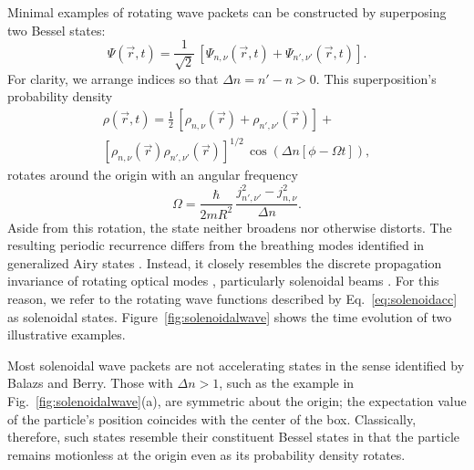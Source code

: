 Minimal examples of rotating wave packets
can be constructed by superposing two Bessel states:
\begin{equation}
  \label{eq:solenoidacc}
  \Psi(\vec{r}, t)
  =
  \frac{1}{\sqrt{2}} \, \left[
    \Psi_{n,\nu}(\vec{r}, t) +
    \Psi_{n', \nu'}(\vec{r}, t)
  \right].
\end{equation}
For clarity, we arrange indices so that $\Delta n = n' - n > 0$.
This superposition's probability density
\begin{multline}
  \rho(\vec{r}, t)
  =
  \frac{1}{2} \, 
  \left[ \rho_{n,\nu}(\vec{r}) + \rho_{n',\nu'}(\vec{r}) \right] + \\
  \left[ \rho_{n,\nu}(\vec{r}) \rho_{n',\nu'}(\vec{r}) \right]^{1/2} \,
    \cos\left( \Delta n[ \phi - \Omega t] \right),
\end{multline}
rotates around the origin with an angular frequency
\begin{equation}
  \label{eq:frequency}
  \Omega = \frac{\hbar}{2m R^2} \,
  \frac{j_{n',\nu'}^2 - j_{n,\nu}^2}{\Delta n}.
\end{equation}
Aside from this rotation, the state neither broadens nor
otherwise distorts.
The resulting periodic recurrence differs from the
breathing modes identified in generalized Airy states
\cite{kaminer12}.
Instead, it closely resembles the discrete
propagation invariance of rotating optical modes \cite{tervo2001},
particularly solenoidal beams \cite{lee10}.
For this reason, we refer to the rotating
wave functions described by Eq.~\eqref{eq:solenoidacc} as
solenoidal states.
Figure~\ref{fig:solenoidalwave} shows the time evolution of
two illustrative examples.

Most solenoidal wave packets are not accelerating states in the sense
identified by Balazs and Berry.
Those with $\Delta n > 1$, such as the example
in Fig.~\ref{fig:solenoidalwave}(a), are symmetric about the origin;
the expectation value of the particle's position coincides with
the center of the box.
Classically, therefore, such states resemble their constituent Bessel states
in that the particle remains motionless at the origin even as its
probability density rotates.

